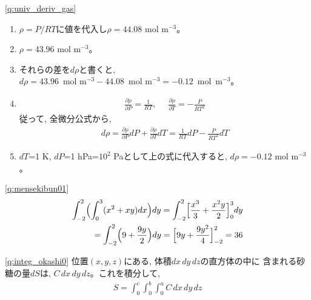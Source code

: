 \ref{q:univ_deriv_gas}  
\begin {enumerate}
\item $\rho=P/RT$に値を代入し$\rho=44.08$ mol m$^{-3}$。
\item $\rho=43.96$ mol m$^{-3}$。
\hv
\item それらの差を$d\rho$と書くと, \\
$d\rho=43.96$~mol m$^{-3}-44.08$~mol m$^{-3}=-0.12$~mol~m$^{-3}$。
\item 
\begin{eqnarray*}\frac{\partial \rho}{\partial P}=\frac{1}{RT},\,\,\,\,\,\,\,\, \frac{\partial \rho}{\partial T}=-\frac{P}{RT^2}\end{eqnarray*}
従って, 全微分公式から, 
\begin{eqnarray*}d\rho=\frac{\partial \rho}{\partial P}dP + \frac{\partial \rho}{\partial T}dT
=\frac{1}{RT}dP-\frac{P}{RT^2}dT\end{eqnarray*}
\hv
\item $dT$=1 K, $dP$=1 hPa=$10^2$ Paとして上の式に代入すると, 
$d\rho=-0.12$ mol m$^{-3}$。
\end{enumerate}
\mv

%
\ref{q:mensekibun01}
\begin{eqnarray*}
\int_{-2}^{2}\Bigl(\int_{0}^{3}(x^2+xy)dx\Bigr)dy
=\int_{-2}^{2}\Bigl[\frac{x^3}{3}+\frac{x^2y}{2}\Bigr]_0^3dy\\
=\int_{-2}^{2}\Bigl(9+\frac{9y}{2}\Bigr)dy
=\Bigl[9y+\frac{9y^2}{4}\Bigr]_{-2}^2
=36
\end{eqnarray*}
\mv

\ref{q:integ_okashi0} 
位置$(x, y, z)$にある, 体積$dx\,dy\,dz$の直方体の中に
含まれる砂糖の量$dS$は, $C\,dx\,dy\,dz$。これを積分して, 
\begin{eqnarray*}
S=\int_{0}^{c}\int_{0}^{b}\int_{0}^{a}C\,dx\,dy\,dz
\end{eqnarray*}

